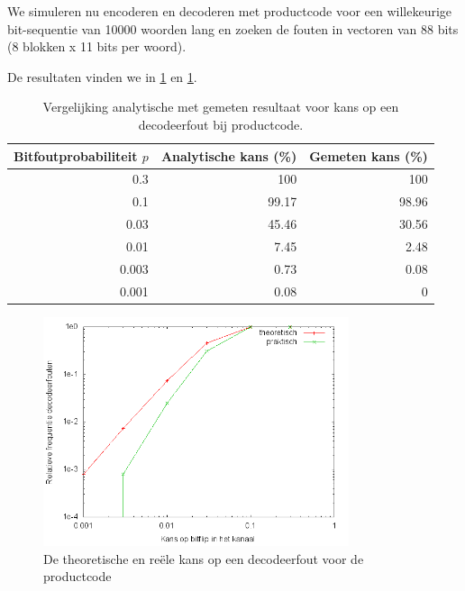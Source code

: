 \documentclass[]{article}
\begin{document}
\begin{section}
\begin{subsection}
        We simuleren nu encoderen en decoderen met productcode voor een
        willekeurige bit-sequentie van 10000 woorden lang en zoeken de
        fouten in vectoren van 88 bits (8 blokken x 11 bits per woord).
        
        De resultaten vinden we in \ref{tab:2_6} en \ref{fig:2_6}.

        \begin{table}[h]
            \centering	
            \begin{tabular}{r|r|r}
                Bitfoutprobabiliteit $p$ &
                Analytische kans (\%) &
                Gemeten kans (\%)\\
                \hline
                0.3   & 100    & 100   \\
                0.1   &  99.17 & 98.96 \\
                0.03  &  45.46 & 30.56 \\
                0.01  &   7.45 & 2.48  \\
                0.003 &   0.73 & 0.08  \\
                0.001 &   0.08 & 0
            \end{tabular}
            \caption{Vergelijking analytische met gemeten resultaat
            voor kans op een decodeerfout bij productcode.}
            \label{tab:2_6}
        \end{table}
        
        \begin{figure}[h]
            \centering
            \includegraphics[width=0.8\textwidth]{vraag2_6.png}
            \caption{De theoretische en re\"ele kans op een
            decodeerfout voor de productcode}
            \label{fig:2_6}
        \end{figure}
        

\end{subsection}
\end{section}
\end{document}
